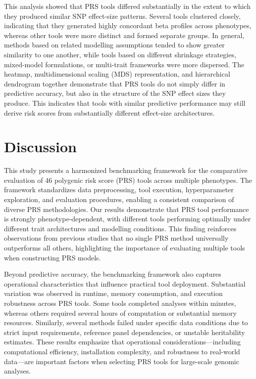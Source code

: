 \documentclass[pdflatex,sn-basic]{sn-jnl}
\begin{document}
This analysis showed that PRS tools differed substantially in the extent to which they produced similar SNP effect-size patterns. Several tools clustered closely, indicating that they generated highly concordant beta profiles across phenotypes, whereas other tools were more distinct and formed separate groups. In general, methods based on related modelling assumptions tended to show greater similarity to one another, while tools based on different shrinkage strategies, mixed-model formulations, or multi-trait frameworks were more dispersed. The heatmap, multidimensional scaling (MDS) representation, and hierarchical dendrogram together demonstrate that PRS tools do not simply differ in predictive accuracy, but also in the structure of the SNP effect sizes they produce. This indicates that tools with similar predictive performance may still derive risk scores from substantially different effect-size architectures.




\section*{Discussion}

This study presents a harmonized benchmarking framework for the comparative evaluation of 46 polygenic risk score (PRS) tools across multiple phenotypes. The framework standardizes data preprocessing, tool execution, hyperparameter exploration, and evaluation procedures, enabling a consistent comparison of diverse PRS methodologies. Our results demonstrate that PRS tool performance is strongly phenotype-dependent, with different tools performing optimally under different trait architectures and modelling conditions. This finding reinforces observations from previous studies that no single PRS method universally outperforms all others, highlighting the importance of evaluating multiple tools when constructing PRS models.

Beyond predictive accuracy, the benchmarking framework also captures operational characteristics that influence practical tool deployment. Substantial variation was observed in runtime, memory consumption, and execution robustness across PRS tools. Some tools completed analyses within minutes, whereas others required several hours of computation or substantial memory resources. Similarly, several methods failed under specific data conditions due to strict input requirements, reference panel dependencies, or unstable heritability estimates. These results emphasize that operational considerations—including computational efficiency, installation complexity, and robustness to real-world data—are important factors when selecting PRS tools for large-scale genomic analyses.
\end{document}
